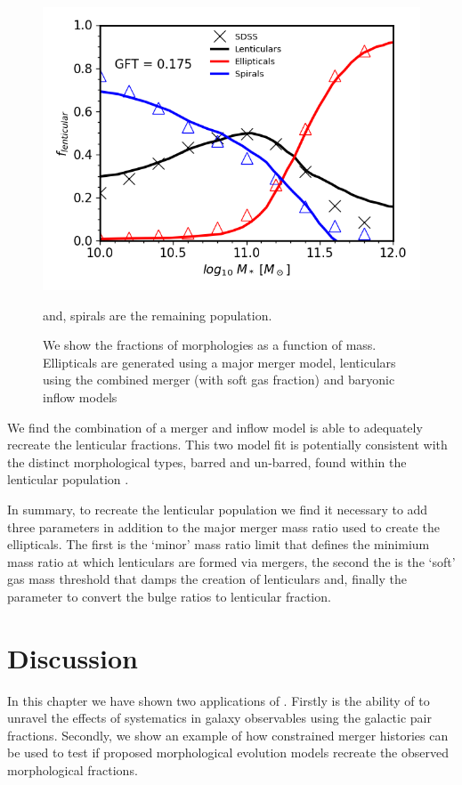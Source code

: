 \begin{figure}
  \includegraphics[width=\linewidth]{Figures/Chapter5/Bulge_Growth_Final_All_Morph.png}
    \caption{We show the fractions of morphologies as a function of mass. Ellipticals are generated using a major merger model, lenticulars using the combined merger (with soft gas fraction) and baryonic inflow models} and, spirals are the remaining population.
    \label{fig:All_Morphologies}
\end{figure}

We find the combination of a merger and inflow model is able to adequately recreate the lenticular fractions. This two model fit is potentially consistent with the distinct morphological types, barred and un-barred, found within the lenticular population \cite{Laurikainen2005MulticomponentGalaxies, VanDenBergh2012LuminositiesGalaxies}.

In summary, to recreate the lenticular population we find it necessary to add three parameters in addition to the major merger mass ratio used to create the ellipticals. The first is the `minor' mass ratio limit that defines the minimium mass ratio at which lenticulars are formed via mergers, the second the is the `soft' gas mass threshold that damps the creation of lenticulars and, finally the parameter to convert the bulge ratios to lenticular fraction. 

\section{Discussion}

In this chapter we have shown two applications of \steel. Firstly is the ability of \steel to unravel the effects of systematics in galaxy observables using the galactic pair fractions. Secondly, we show an example of how constrained merger histories can be used to test if proposed morphological evolution models recreate the observed morphological fractions.  

